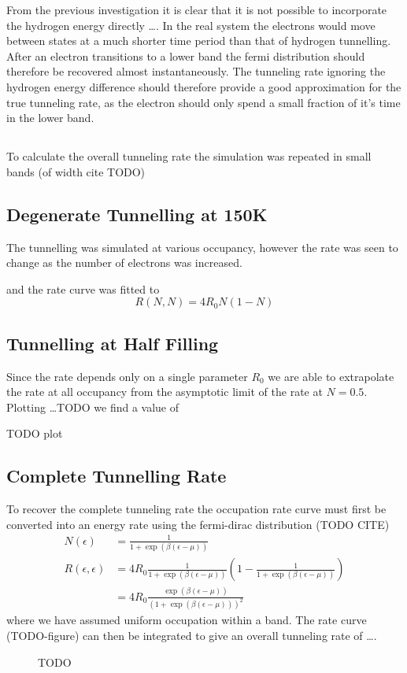 
From the previous investigation it is clear
that it is not possible to incorporate the
hydrogen energy directly \ldots. In the
real system the electrons would move
between states at a much shorter time
period than that of hydrogen tunnelling.
After an electron transitions to a lower
band the fermi distribution should therefore
be recovered almost instantaneously.
The tunneling rate ignoring the
hydrogen energy difference should
therefore provide a good approximation
for the true tunneling rate, as the
electron should only spend a small
fraction of it's time in the lower band.

\subsection{}
To calculate the overall tunneling rate
the simulation was repeated in small
bands (of width cite TODO)




\subsection{Degenerate Tunnelling at 150K}
The tunnelling was simulated at various occupancy,
however the rate was seen to change as the
number of electrons was increased.

and the rate curve was fitted to
\begin{equation}
    R(N,N) = 4 R_0 N(1-N)\label{eqn:degenerate tunnelling rate}
\end{equation}

\subsection{Tunnelling at Half Filling}
Since the rate depends only on a single
parameter \(R_0\) we are able to
extrapolate the rate at all
occupancy from the asymptotic
limit of the rate at \(N=0.5\).
Plotting \ldots TODO we find
a value of

TODO plot


\subsection{Complete Tunnelling Rate}
To recover the complete tunneling
rate the occupation rate curve
must first be converted into an
energy rate using the
fermi-dirac distribution (TODO CITE)
\begin{align}
    N(\epsilon)           & = \frac{1}{1 + \exp{(\beta(\epsilon - \mu))}}                                                      \\
    R(\epsilon, \epsilon) & = 4R_0 \frac{1}{1 + \exp{(\beta(\epsilon - \mu))}}(1- \frac{1}{1 + \exp{(\beta(\epsilon - \mu))}}) \\
                          & = 4R_0 \frac{\exp{(\beta(\epsilon - \mu))}}{{(1 + \exp{(\beta(\epsilon - \mu))})}^2}
\end{align}
where we have assumed uniform
occupation within a band.
The rate curve (TODO-figure) can then be
integrated to give an
overall tunneling rate of \ldots.
\begin{figure}
    TODO
\end{figure}

